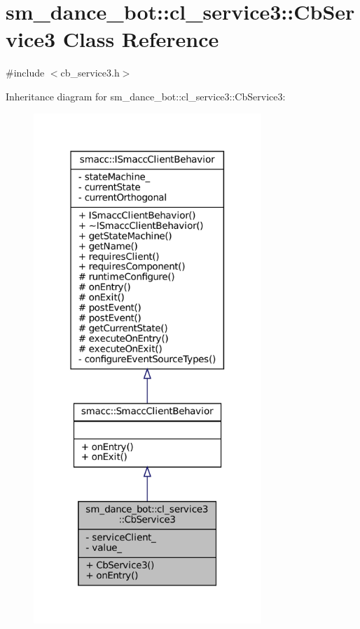 \hypertarget{classsm__dance__bot_1_1cl__service3_1_1CbService3}{}\section{sm\+\_\+dance\+\_\+bot\+:\+:cl\+\_\+service3\+:\+:Cb\+Service3 Class Reference}
\label{classsm__dance__bot_1_1cl__service3_1_1CbService3}


{\ttfamily \#include $<$cb\+\_\+service3.\+h$>$}



Inheritance diagram for sm\+\_\+dance\+\_\+bot\+:\+:cl\+\_\+service3\+:\+:Cb\+Service3\+:
\nopagebreak
\begin{figure}[H]
\begin{center}
\leavevmode
\includegraphics[width=244pt]{classsm__dance__bot_1_1cl__service3_1_1CbService3__inherit__graph}
\end{center}
\end{figure}


